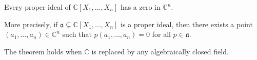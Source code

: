 Every proper ideal of $\mathbb{C}[X_1, \ldots, X_n]$ has a zero in $\mathbb{C}^n$.

More precisely, if $\mathfrak{a} \subsetneq \mathbb{C}[X_1, \ldots, X_n]$ is a proper ideal, then there exists a point $(a_1, \ldots, a_n) \in \mathbb{C}^n$ such that $p(a_1, \ldots, a_n) = 0$ for all $p \in \mathfrak{a}$.

The theorem holds when $\mathbb{C}$ is replaced by any algebraically closed field.
